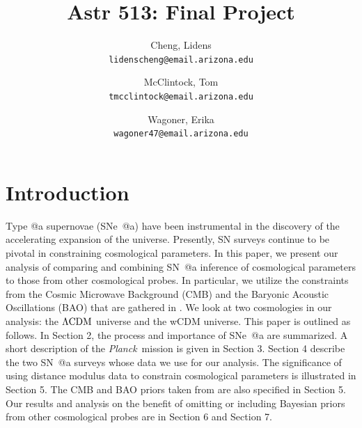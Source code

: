 \documentclass[12pt,a4paper]{article}
\author{
  Cheng, Lidens\\
  \texttt{lidenscheng@email.arizona.edu}
  \and
  McClintock, Tom\\
  \texttt{tmcclintock@email.arizona.edu}
  \and
  Wagoner, Erika\\
  \texttt{wagoner47@email.arizona.edu}
}
\title{Astr 513: Final Project}
\makeatletter
\newcommand\Planck{{\it Planck}\ }
\newcommand*{\rom}[1]{\expandafter\@slowromancap\romannumeral #1@}
\newcommand{\sn}{\mbox{SN}}
\newcommand{\sna}{\mbox{SN \rom{1}a}}
\newcommand{\snea}{\mbox{SNe \rom{1}a}}
\makeatother
\begin{document}
\maketitle

\section{Introduction}
\label{sec:Intro}
Type \rom{1}a supernovae (\snea{}) have been instrumental in the discovery 
of the accelerating expansion of the universe. Presently, {\sn} surveys continue 
to be pivotal in constraining cosmological parameters. In this paper, we present 
our analysis of comparing and combining {\sna} inference of cosmological parameters 
to those from other cosmological probes. In particular, we utilize the constraints 
from the Cosmic Microwave Background (CMB) and the Baryonic Acoustic Oscillations 
(BAO) that are gathered in \citet{planck2013}. We look at two cosmologies in our 
analysis: the $\Lambda \textnormal{CDM}$ universe and the wCDM universe. This 
paper is outlined as follows. In Section 2, the process and importance of {\snea} 
are summarized. A short description of the \Planck mission is given in Section 3. 
Section 4 describe the two {\sna} surveys whose data we use for our analysis. The 
significance of using distance modulus data to constrain cosmological parameters 
is illustrated in Section 5. The CMB and BAO priors taken from \citet{planck2013} 
are also specified in Section 5. Our results and analysis on the benefit of omitting 
or including Bayesian priors from other cosmological probes 
are in Section 6 and Section 7.  
\end{document}
